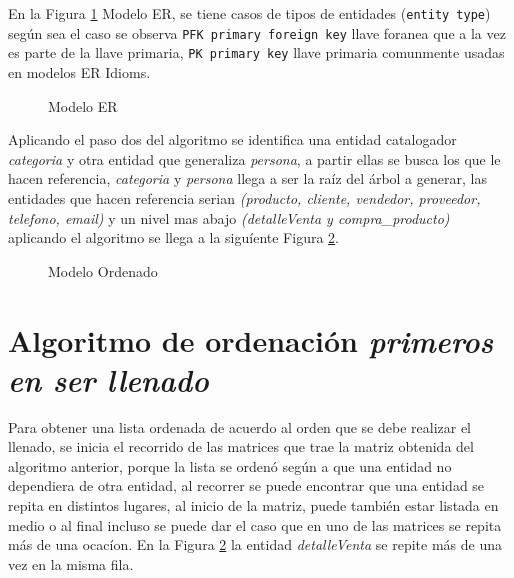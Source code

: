 En la Figura \ref{fig:Modelo ER} Modelo ER, se tiene casos de tipos de entidades (\texttt{entity type}) seg\'un sea el caso se observa \texttt{PFK primary foreign key} llave foranea que a la vez es parte de la llave primaria, \texttt{PK primary key} llave primaria comunmente usadas en modelos ER Idioms.
\begin{figure}[H]
\centering
{}
\caption{Modelo ER} 
\label{fig:Modelo ER}
\end{figure}
Aplicando el paso dos del algoritmo se identifica una entidad catalogador \emph{categoria} y otra entidad que generaliza \emph{persona}, a partir ellas se busca los que le hacen referencia, \textit{categoria} y \textit{persona} llega a ser  la ra\'iz del \'arbol a generar, las entidades que hacen referencia serian \textit{(producto, cliente, vendedor, proveedor, telefono, email)} y un nivel mas abajo \textit{(detalleVenta y compra\_producto)}  aplicando el algoritmo se llega a la sigu\'iente Figura \ref{fig:ModeloOrdenado}.
\begin{figure}[H]
\centering
{}
\caption{Modelo Ordenado} \label{fig:ModeloOrdenado}
\end{figure}
\section{Algoritmo de ordenaci\'on \textit{primeros en ser llenado}}
\label{Algoritmo de ordenacion primeros en ser llenado}
Para obtener una lista ordenada de acuerdo al orden que se debe realizar el llenado, se inicia el recorrido de las matrices que trae la matriz obtenida del algoritmo anterior, porque la lista se orden\'o seg\'un a que una entidad no dependiera de otra entidad, al recorrer se puede encontrar que una entidad se repita en distintos lugares, al  inicio de la matriz, puede tambi\'en estar listada en medio o al final incluso se puede dar el caso que en uno de las matrices se repita m\'as de una ocac\'ion. En la Figura \ref{fig:ModeloOrdenado} la entidad \textit{detalleVenta} se repite m\'as de una vez en la misma fila.


